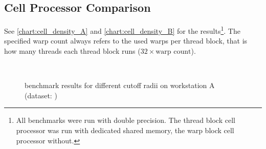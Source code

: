 \subsection{Cell Processor Comparison}
\label{subsec:dataset_info}
See \autoref{chart:cell_density_A} and \autoref{chart:cell_density_B} for the results\footnote{All benchmarks were run with double precision. The thread block cell processor was run with dedicated shared memory, the warp block cell processor without.}. The specified warp count always refers to the used warps per thread block, that is how many threads each thread block runs ($ 32 \times \text{warp count} $).

\begin{figure}
\centering
{}
\\
\caption{benchmark results for different cutoff radii on workstation A (dataset: )}
\label{chart:cell_density_A}
\end{figure}
